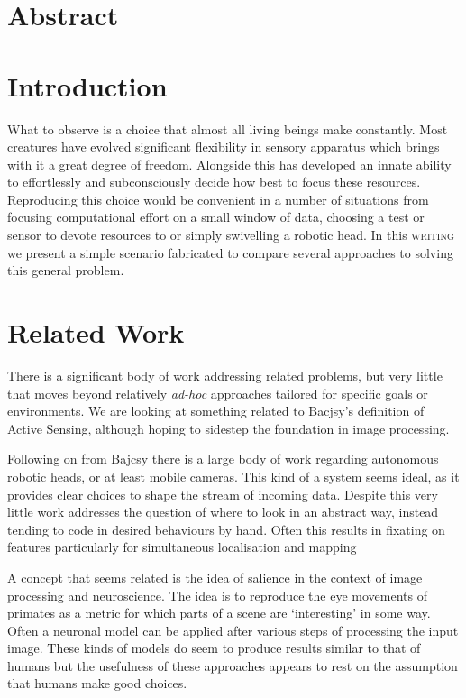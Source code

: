 \documentclass{article}
\begin{document}
\section{Abstract}
\section{Introduction}
What to observe is a choice that almost all living beings make constantly. Most creatures
have evolved significant flexibility in sensory apparatus which brings with it a great 
degree of freedom. Alongside this has developed an innate ability to effortlessly and
subconsciously decide how best to focus these resources. Reproducing this choice would 
be convenient in a number of situations from focusing computational effort on a small 
window of data, choosing a test or sensor to devote resources to or simply swivelling
a robotic head. In this {\textsc{writing}} we present a simple scenario fabricated
to compare several approaches to solving this general problem. 

\section{Related Work}
There is a significant body of work addressing related problems, but very little that 
moves beyond relatively \textit{ad-hoc} approaches tailored for specific goals or 
environments. We are looking at something related to Bacjsy's definition of Active 
Sensing, although hoping to sidestep the foundation in image processing.
\autocite{bajcsy1988active}

Following on from Bajcsy there is a large body of work regarding autonomous robotic 
heads, or at least mobile cameras. This kind of a system seems ideal, as it provides 
clear choices to shape the stream of incoming data. Despite this very little work
addresses the question of where to look in an abstract way, instead tending to code in 
desired behaviours by hand. Often this results in fixating on features particularly for 
simultaneous localisation and mapping \autocite{davison2002simultaneous, davison20013d}

A concept that seems related is the idea of salience in the context of image processing
and neuroscience.
The idea is to reproduce the eye movements of primates as a metric for which parts of
a scene are `interesting' in some way. Often a neuronal model can be applied after 
various steps of processing the input image. \autocite{itti1998salience} 
These kinds of models do seem to produce results similar to that of humans 
\autocite{parkhurst2002modeling} but the usefulness of these approaches appears to 
rest on the assumption that humans make good choices.
\end{document}
